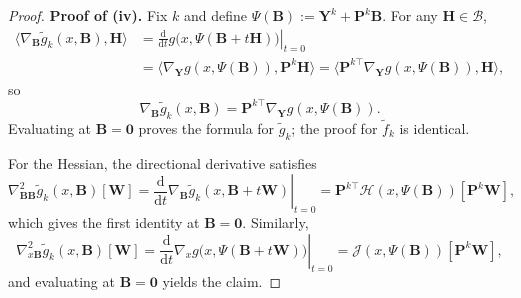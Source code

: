 \documentclass{pkumelon}
\theoremstyle{plain}
\begin{document}
\begin{proof}
\textbf{Proof of (iv). }
Fix $k$ and define $\Psi(\boldsymbol B):=\boldsymbol Y^k+\boldsymbol P^k\boldsymbol B$. For any $\boldsymbol H\in\mathcal B$,
\begin{equation*}
\begin{aligned}
\langle \nabla_{\boldsymbol B}\tilde g_k(x,\boldsymbol B),\boldsymbol H\rangle
&=
\left.\frac{\mathrm d}{\mathrm dt}g\bigl(x,\Psi(\boldsymbol B+t\boldsymbol H)\bigr)\right|_{t=0} \\
&=
\langle \nabla_{\boldsymbol Y}g(x,\Psi(\boldsymbol B)),\boldsymbol P^k\boldsymbol H\rangle =
\langle \boldsymbol P^{k\top}\nabla_{\boldsymbol Y}g(x,\Psi(\boldsymbol B)),\boldsymbol H\rangle,
\end{aligned}
\end{equation*}
so
\begin{equation*}
\nabla_{\boldsymbol B}\tilde g_k(x,\boldsymbol B)=\boldsymbol P^{k\top}\nabla_{\boldsymbol Y}g(x,\Psi(\boldsymbol B)).
\end{equation*}
Evaluating at $\boldsymbol B=\mathbf 0$ proves the formula for $\tilde g_k$; the proof for $\tilde f_k$ is identical.

For the Hessian, the directional derivative satisfies
\begin{equation*}
\nabla_{\boldsymbol B\boldsymbol B}^2\tilde g_k(x,\boldsymbol B)[\boldsymbol W] = \left.\frac{\mathrm d}{\mathrm dt}\nabla_{\boldsymbol B}\tilde g_k(x,\boldsymbol B+t\boldsymbol W)\right|_{t=0} = \boldsymbol P^{k\top}\mathcal H(x,\Psi(\boldsymbol B))[\boldsymbol P^k\boldsymbol W],
\end{equation*}
which gives the first identity at $\boldsymbol B=\mathbf 0$. Similarly,
\begin{equation*}
\nabla_{x\boldsymbol B}^2\tilde g_k(x,\boldsymbol B)[\boldsymbol W] = \left.\frac{\mathrm d}{\mathrm dt}\nabla_x g\bigl(x,\Psi(\boldsymbol B+t\boldsymbol W)\bigr)\right|_{t=0} = \mathcal J(x,\Psi(\boldsymbol B))[\boldsymbol P^k\boldsymbol W],
\end{equation*}
and evaluating at $\boldsymbol B=\mathbf 0$ yields the claim.
\end{proof}
\end{document}
